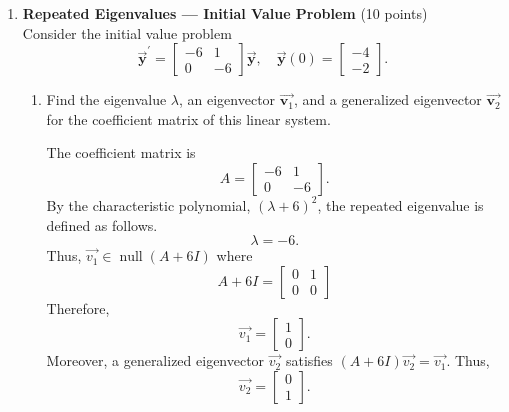 \begin{enumerate}
  \textbf{Note}: if you are feeling adventurous you could use other 
  eigenvectors like $4 \overrightarrow{\boldsymbol{v}}$ and other 
  generalized eigenvectors like $\overrightarrow{\boldsymbol{w}}-3 \overrightarrow{\boldsymbol{v}}$. 
  Just remember that if you change $\overrightarrow{\boldsymbol{v}}$, 
  you must also change $\overrightarrow{\boldsymbol{w}}$ for its fundamental solution!

  \newpage





  \item \textbf{Repeated Eigenvalues --- Initial Value Problem} (10 points)\\
  Consider the initial value problem
  \[
  \overrightarrow{\boldsymbol{y}}^{\prime}=\left[\begin{array}{rr}-6 & 1 \\ 0 & -6\end{array}\right] \overrightarrow{\boldsymbol{y}},\quad \overrightarrow{\boldsymbol{y}}(0)=\left[\begin{array}{r}-4 \\ -2\end{array}\right].
\]
  \begin{enumerate}[label=(\alph*)]
    \item Find the eigenvalue $\lambda$, an eigenvector $\overrightarrow{\boldsymbol{v}_1}$, and a generalized eigenvector $\overrightarrow{\boldsymbol{v}_2}$ for the coefficient matrix of this linear system.
    \begin{subanswer}
      The coefficient matrix is
      \[
        A=\left[\begin{array}{rr}-6 & 1 \\ 0 & -6\end{array}\right].
      \]
      By the characteristic polynomial, $(\lambda+6)^2$, the repeated eigenvalue is defined as follows.
      \[
        \lambda=-6.
      \]
      Thus, \(\overrightarrow{v_1}\in\operatorname{null}(A+6I)\) where
      \[
        A+6I=\left[\begin{array}{rr}0 & 1 \\ 0 & 0\end{array}\right]
      \]
      Therefore,
      \[
        \overrightarrow{v_1}=\left[\begin{array}{r}1 \\ 0\end{array}\right].
      \]
      Moreover, a generalized eigenvector $\overrightarrow{v_2}$ satisfies 
      $(A+6I)\overrightarrow{v_2}=\overrightarrow{v_1}$. Thus,
      \[
        \overrightarrow{v_2}=\left[\begin{array}{r}0 \\ 1\end{array}\right].
      \]
    \end{subanswer}


\end{enumerate}
\end{enumerate}
